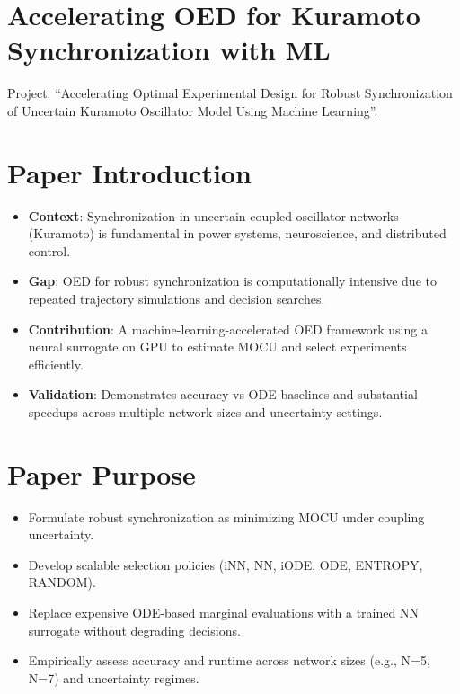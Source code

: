 \documentclass[11pt]{article}
\begin{document}
\section*{Accelerating OED for Kuramoto Synchronization with ML}
Project: ``Accelerating Optimal Experimental Design for Robust Synchronization of Uncertain Kuramoto Oscillator Model Using Machine Learning''.

\newpage\section*{Paper Introduction}
\begin{itemize}
\item \textbf{Context}: Synchronization in uncertain coupled oscillator networks (Kuramoto) is fundamental in power systems, neuroscience, and distributed control.
\item \textbf{Gap}: OED for robust synchronization is computationally intensive due to repeated trajectory simulations and decision searches.
\item \textbf{Contribution}: A machine-learning-accelerated OED framework using a neural surrogate on GPU to estimate MOCU and select experiments efficiently.
\item \textbf{Validation}: Demonstrates accuracy vs ODE baselines and substantial speedups across multiple network sizes and uncertainty settings.
\end{itemize}

\newpage\section*{Paper Purpose}
\begin{itemize}
\item Formulate robust synchronization as minimizing MOCU under coupling uncertainty.
\item Develop scalable selection policies (iNN, NN, iODE, ODE, ENTROPY, RANDOM).
\item Replace expensive ODE-based marginal evaluations with a trained NN surrogate without degrading decisions.
\item Empirically assess accuracy and runtime across network sizes (e.g., N=5, N=7) and uncertainty regimes.
\end{itemize}
\end{document}
